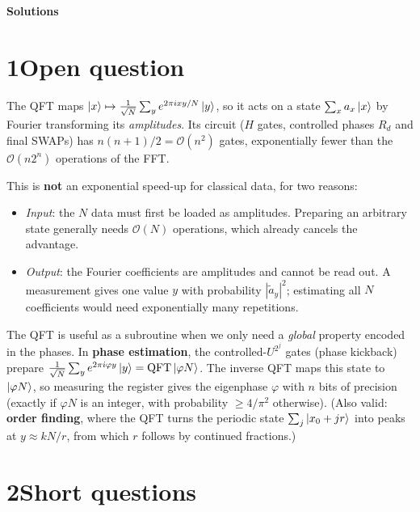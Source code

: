 \documentclass[11pt,a4paper]{article}
\newcommand{\sol}{\color{blue!60!black}}
\begin{document}
\ifdefined\nosolutions\else
\newpage
\begin{center}
\Large\textbf{Solutions}
\end{center}
\sol

\section*{1\quad Open question}

The QFT maps $\ket x\mapsto\frac1{\sqrt N}\sum_ye^{2\pi ixy/N}\ket y$, so it acts on a state
$\sum_xa_x\ket x$ by Fourier transforming its \emph{amplitudes}. Its circuit ($H$ gates, controlled
phases $R_d$ and final SWAPs) has $n(n+1)/2=\mathcal O(n^2)$ gates, exponentially fewer than the
$\mathcal O(n2^n)$ operations of the FFT.

This is \textbf{not} an exponential speed-up for classical data, for two reasons:
\begin{itemize}
\item \emph{Input}: the $N$ data must first be loaded as amplitudes. Preparing an arbitrary state
generally needs $\mathcal O(N)$ operations, which already cancels the advantage.
\item \emph{Output}: the Fourier coefficients are amplitudes and cannot be read out. A measurement
gives one value $y$ with probability $|\tilde a_y|^2$; estimating all $N$ coefficients would need
exponentially many repetitions.
\end{itemize}
The QFT is useful as a subroutine when we only need a \emph{global} property encoded in the phases.
In \textbf{phase estimation}, the controlled-$U^{2^j}$ gates (phase kickback) prepare
$\frac1{\sqrt N}\sum_ye^{2\pi i\varphi y}\ket y=\text{QFT}\ket{\varphi N}$. The inverse QFT maps this
state to $\ket{\varphi N}$, so measuring the register gives the eigenphase $\varphi$ with $n$ bits
of precision (exactly if $\varphi N$ is an integer, with probability $\ge4/\pi^2$ otherwise).
(Also valid: \textbf{order finding}, where the QFT turns the periodic state
$\sum_j\ket{x_0+jr}$ into peaks at $y\approx kN/r$, from which $r$ follows by continued fractions.)

\section*{2\quad Short questions}
\end{document}

